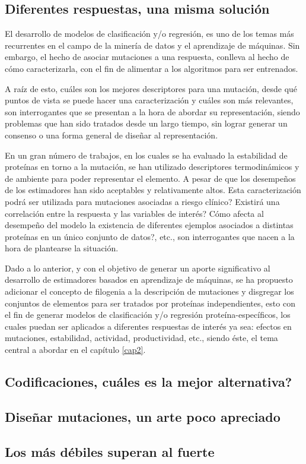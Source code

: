 \subsection{Diferentes respuestas, una misma solución}

El desarrollo de modelos de clasificación y/o regresión, es uno de los temas más recurrentes en el campo de la minería de datos y el aprendizaje de máquinas. Sin embargo, el hecho de asociar mutaciones a una respuesta, conlleva al hecho de cómo caracterizarla, con el fin de alimentar a los algoritmos para ser entrenados. 

A raíz de esto, cuáles son los mejores descriptores para una mutación, desde qué puntos de vista se puede hacer una caracterización y cuáles son más relevantes, son interrogantes que se presentan a la hora de abordar su representación, siendo problemas que han sido tratados desde un largo tiempo, sin lograr generar un consenso o una forma general de diseñar al representación. 

En un gran número de trabajos, en los cuales se ha evaluado la estabilidad de proteínas en torno a la mutación, se han utilizado descriptores termodinámicos y de ambiente para poder representar el elemento. A pesar de que los desempeños de los estimadores han sido aceptables y relativamente altos. Esta caracterización podrá ser utilizada para mutaciones asociadas a riesgo clínico? Existirá una correlación entre la respuesta y las variables de interés? Cómo afecta al desempeño del modelo la existencia de diferentes ejemplos asociados a distintas proteínas en un único conjunto de datos?, etc., son interrogantes que nacen a la hora de plantearse la situación.

Dado a lo anterior, y con el objetivo de generar un aporte significativo al desarrollo de estimadores basados en aprendizaje de máquinas, se ha propuesto adicionar el concepto de filogenia a la descripción de mutaciones y disgregar los conjuntos de elementos para ser tratados por proteínas independientes, esto con el fin de generar modelos de clasificación y/o regresión proteína-específicos, los cuales puedan ser aplicados a diferentes respuestas de interés ya sea: efectos en mutaciones, estabilidad, actividad, productividad, etc., siendo éste, el tema central a abordar en el capítulo \ref{cap2}.
 
\subsection{Codificaciones, cuáles es la mejor alternativa?}

\subsection{Diseñar mutaciones, un arte poco apreciado}

\subsection{Los más débiles superan al fuerte}